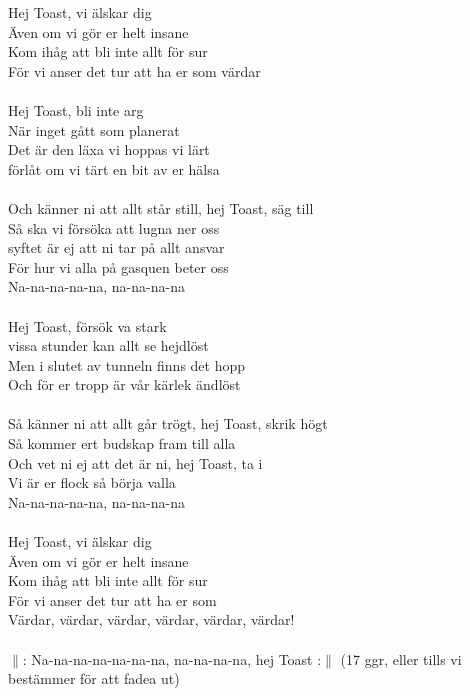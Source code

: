 \documentclass[a6paper, 10pt, twoside]{article}
\begin{document}
\begin{center}
\end{center}
\begin{lyrics}
Hej Toast, vi älskar dig\\
Även om vi gör er helt insane\\
Kom ihåg att bli inte allt för sur\\
För vi anser det tur att ha er som värdar\\
\vspace{5pt}\\
Hej Toast, bli inte arg\\
När inget gått som planerat\\
Det är den läxa vi hoppas vi lärt\\
förlåt om vi tärt en bit av er hälsa\\
\vspace{5pt}\\
Och känner ni att allt står still, hej Toast, säg till\\
Så ska vi försöka att lugna ner oss\\
syftet är ej att ni tar på allt ansvar\\
För hur vi alla på gasquen beter oss\\
Na-na-na-na-na, na-na-na-na\\
\vspace{5pt}\\
Hej Toast, försök va stark\\
vissa stunder kan allt se hejdlöst\\
Men i slutet av tunneln finns det hopp\\
Och för er tropp är vår kärlek ändlöst\\
\vspace{5pt}\\
Så känner ni att allt går trögt, hej Toast, skrik högt\\
Så kommer ert budskap fram till alla\\
Och vet ni ej att det är ni, hej Toast, ta i\\
Vi är er flock så börja valla\\
Na-na-na-na-na, na-na-na-na\\
\vspace{5pt}\\
Hej Toast, vi älskar dig\\
Även om vi gör er helt insane\\
Kom ihåg att bli inte allt för sur\\
För vi anser det tur att ha er som\\
Värdar, värdar, värdar, värdar, värdar, värdar!\\
\vspace{5pt}\\
$\|$: Na-na-na-na-na-na-na, na-na-na-na, hej Toast :$\|$ (17 ggr, eller tills vi bestämmer för att fadea ut)
\end{lyrics}
\end{document}
